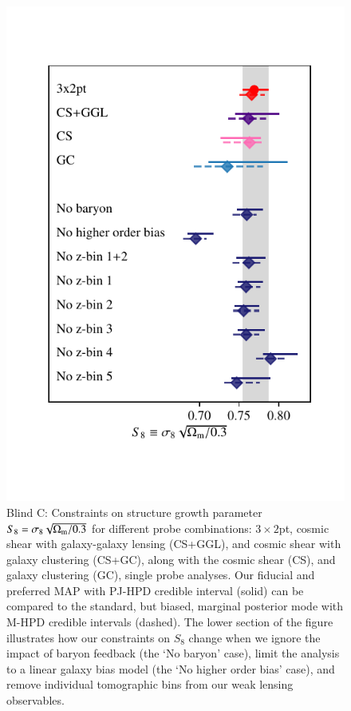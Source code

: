 \begin{figure}
	\begin{center}
		\includegraphics[width=\columnwidth]{Parameter_Plots/systematics/S8_comparison_blindC}
		\caption{Blind C: Constraints on structure growth parameter $S_{8} = \sigma_8 \sqrt{\Omega_{\rm m}/0.3}$ for different probe combinations: $3\times2$pt, cosmic shear with galaxy-galaxy lensing (CS+GGL), and cosmic shear with galaxy clustering (CS+GC), along with the cosmic shear (CS), and galaxy clustering (GC), single probe analyses.   Our fiducial and preferred MAP with PJ-HPD credible interval (solid) can be compared to the standard, but biased, marginal posterior mode with M-HPD credible intervals (dashed).   The lower section of the figure illustrates how our constraints on $S_8$ change when we ignore the impact of baryon feedback (the `No baryon' case), limit the analysis to a linear galaxy bias model (the `No higher order bias' case), and remove individual tomographic bins from our weak lensing observables.    
		}
		\label{fig:S8comp}
	\end{center}
\end{figure}


